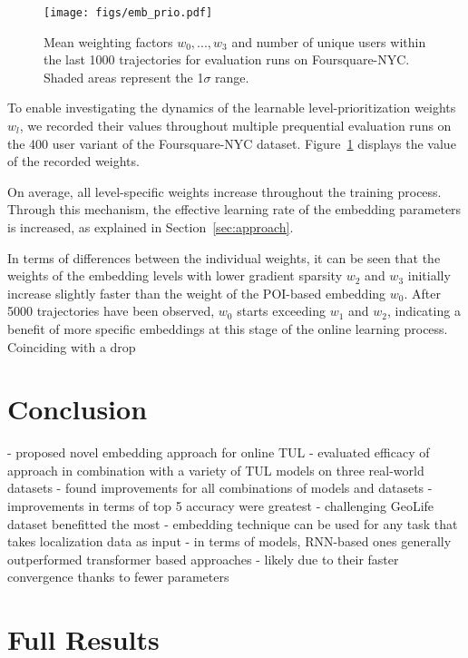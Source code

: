 \documentclass{article} %
\theoremstyle{definition}
\begin{document}
\begin{figure}[h]
    \centering
    \texttt{[image: figs/emb\_prio.pdf]}
    \caption{Mean weighting factors $w_0, ..., w_3$ and number of unique users within the last 1000 trajectories for evaluation runs on Foursquare-NYC. Shaded areas represent the 1$\sigma$ range.}
    \label{fig:emb_prio}
\end{figure}

To enable investigating the dynamics of the learnable level-prioritization weights $w_l$, we recorded their values throughout multiple prequential evaluation runs on the 400 user variant of the Foursquare-NYC dataset.
Figure~\ref{fig:emb_prio} displays the value of the recorded weights.

On average, all level-specific weights increase throughout the training process.
Through this mechanism, the effective learning rate of the embedding parameters is increased, as explained in Section~\ref{sec:approach}.

In terms of differences between the individual weights, it can be seen that the weights of the embedding levels with lower gradient sparsity $w_2$ and $w_3$ initially increase slightly faster than the weight of the POI-based embedding $w_0$.
After 5000 trajectories have been observed, $w_0$ starts exceeding $w_1$ and $w_2$, indicating a benefit of more specific embeddings at this stage of the online learning process.
Coinciding with a drop






\section{Conclusion}

- proposed novel embedding approach for online TUL
- evaluated efficacy of approach in combination with a variety of TUL models on three real-world datasets
- found improvements for all combinations of models and datasets
- improvements in terms of top 5 accuracy were greatest
- challenging GeoLife dataset benefitted the most
- embedding technique can be used for any task that takes localization data as input
- in terms of models, RNN-based ones generally outperformed transformer based approaches
- likely due to their faster convergence thanks to fewer parameters




\appendix
\section{Full Results}\label{sec:full_results}
\end{document}
